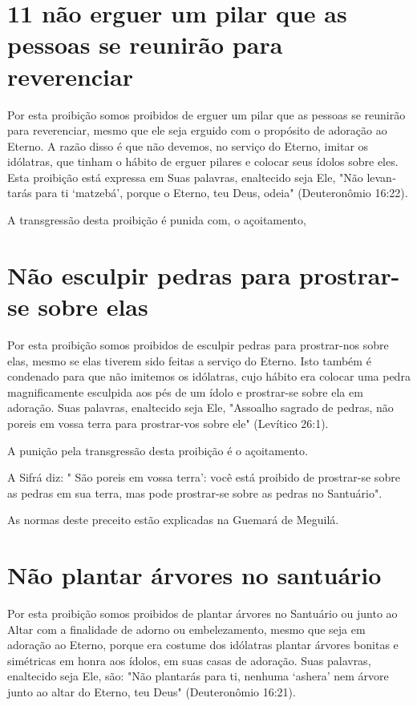 \section{11 não erguer um pilar que as pessoas se reunirão para reverenciar}

Por esta proibição somos proibidos de erguer um pilar que as pessoas se
reunirão para reverenciar, mesmo que ele seja erguido com o propósito de
ado­ração ao Eterno. A razão disso é que não devemos, no serviço do
Eterno, imitar os idólatras, que tinham o hábito de erguer pilares e
colocar seus ídolos sobre eles. Esta proibição está expressa em Suas
palavras, enaltecido seja Ele, "Não levan­tarás para ti `matzebá',
porque o Eterno, teu Deus, odeia" (Deuteronômio 16:22).

A transgressão desta proibição é punida com, o açoitamento,

\section{Não esculpir pedras para prostrar-se sobre elas}

Por esta proibição somos proibidos de esculpir pedras para prostrar-nos
sobre elas, mesmo se elas tiverem sido feitas a serviço do Eterno. Isto
tam­bém é condenado para que não imitemos os idólatras, cujo hábito era
colocar
uma pedra magnificamente esculpida aos pés de um ídolo e prostrar-se
sobre ela em adoração. Suas palavras, enaltecido seja Ele, "Assoalho
sagrado de pe­dras, não poreis em vossa terra para prostrar-vos sobre
ele" (Levítico 26:1).

A punição pela transgressão desta proibição é o açoitamento.

A Sifrá diz: " São poreis em vossa terra': você está proibido de
prostrar-se sobre as pedras em sua terra, mas pode prostrar-se sobre as
pedras no Santuário".


As normas deste preceito estão explicadas na Guemará de Meguilá.

\section{Não plantar árvores no santuário}

Por esta proibição somos proibidos de plantar árvores no Santuário ou
junto ao Altar com a finalidade de adorno ou embelezamento, mesmo que
seja em adoração ao Eterno, porque era costume dos idólatras plantar
árvores bonitas e simétricas em honra aos ídolos, em suas casas de
adoração. Suas pala­vras, enaltecido seja Ele, são: "Não plantarás para
ti, nenhuma `ashera' nem ár­vore junto ao altar do Eterno, teu Deus"
(Deuteronômio 16:21).

